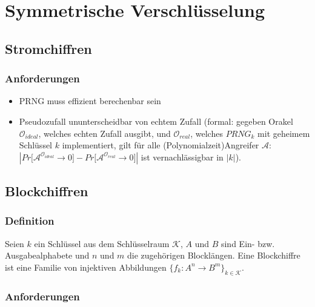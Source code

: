 \documentclass[a4paper,twoside,DIV15,BCOR12mm]{scrbook}
\begin{document}
	
\chapter{Symmetrische Verschlüsselung}


\section{Stromchiffren}


\subsection{Anforderungen}
	\begin{itemize}
		\item PRNG muss effizient berechenbar sein
		\item Pseudozufall ununterscheidbar von echtem Zufall (formal: gegeben Orakel $\mathcal{O}_{ideal}$, welches echten Zufall ausgibt, und $\mathcal{O}_{real}$, welches ${PRNG}_k$ mit geheimem Schlüssel $k$ implementiert, gilt für alle (Polynomialzeit)Angreifer $\mathcal{A}$: $\left| Pr\lbrack \mathcal{A}^{\mathcal{O}_{ideal}} \rightarrow 0 \rbrack - Pr\lbrack \mathcal{A}^{\mathcal{O}_{real}} \rightarrow 0 \rbrack \right|$ ist vernachlässigbar in $\left| k \right|$).
	\end{itemize}
	
\section{Blockchiffren}

\subsection{Definition}

Seien $k$ ein Schlüssel aus dem Schlüsselraum $\mathcal{K}$, $A$ und $B$ sind Ein- bzw. Ausgabealphabete und $n$ und $m$ die zugehörigen Blocklängen. Eine Blockchiffre ist eine Familie von injektiven Abbildungen $\{ f_k \colon A^n \rightarrow B^m \}_{k \in \mathcal{K}}$. \\


\subsection{Anforderungen}
\end{document}
